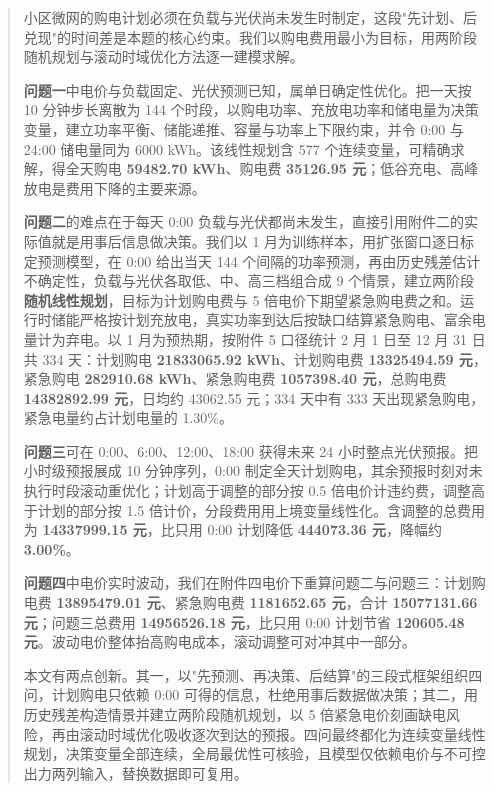 \begin{abstract}

小区微网的购电计划必须在负载与光伏尚未发生时制定，这段"先计划、后兑现"的时间差是本题的核心约束。我们以购电费用最小为目标，用两阶段随机规划与滚动时域优化方法逐一建模求解。

\textbf{问题一}中电价与负载固定、光伏预测已知，属单日确定性优化。把一天按 10 分钟步长离散为 144 个时段，以购电功率、充放电功率和储电量为决策变量，建立功率平衡、储能递推、容量与功率上下限约束，并令 0:00 与 24:00 储电量同为 6000 kWh。该线性规划含 577 个连续变量，可精确求解，得全天购电 \textbf{59482.70 kWh}、购电费 \textbf{35126.95 元}；低谷充电、高峰放电是费用下降的主要来源。

\textbf{问题二}的难点在于每天 0:00 负载与光伏都尚未发生，直接引用附件二的实际值就是用事后信息做决策。我们以 1 月为训练样本，用扩张窗口逐日标定预测模型，在 0:00 给出当天 144 个间隔的功率预测，再由历史残差估计不确定性，负载与光伏各取低、中、高三档组合成 9 个情景，建立两阶段\textbf{随机线性规划}，目标为计划购电费与 5 倍电价下期望紧急购电费之和。运行时储能严格按计划充放电，真实功率到达后按缺口结算紧急购电、富余电量计为弃电。以 1 月为预热期，按附件 5 口径统计 2 月 1 日至 12 月 31 日共 334 天：计划购电 \textbf{21833065.92 kWh}、计划购电费 \textbf{13325494.59 元}，紧急购电 \textbf{282910.68 kWh}、紧急购电费 \textbf{1057398.40 元}，总购电费 \textbf{14382892.99 元}，日均约 43062.55 元；334 天中有 333 天出现紧急购电，紧急电量约占计划电量的 1.30\%。

\textbf{问题三}可在 0:00、6:00、12:00、18:00 获得未来 24 小时整点光伏预报。把小时级预报展成 10 分钟序列，0:00 制定全天计划购电，其余预报时刻对未执行时段滚动重优化；计划高于调整的部分按 0.5 倍电价计违约费，调整高于计划的部分按 1.5 倍计价，分段费用用上境变量线性化。含调整的总费用为 \textbf{14337999.15 元}，比只用 0:00 计划降低 \textbf{444073.36 元}，降幅约 \textbf{3.00\%}。

\textbf{问题四}中电价实时波动，我们在附件四电价下重算问题二与问题三：计划购电费 \textbf{13895479.01 元}、紧急购电费 \textbf{1181652.65 元}，合计 \textbf{15077131.66 元}；问题三总费用 \textbf{14956526.18 元}，比只用 0:00 计划节省 \textbf{120605.48 元}。波动电价整体抬高购电成本，滚动调整可对冲其中一部分。

本文有两点创新。其一，以"先预测、再决策、后结算"的三段式框架组织四问，计划购电只依赖 0:00 可得的信息，杜绝用事后数据做决策；其二，用历史残差构造情景并建立两阶段随机规划，以 5 倍紧急电价刻画缺电风险，再由滚动时域优化吸收逐次到达的预报。四问最终都化为连续变量线性规划，决策变量全部连续，全局最优性可核验，且模型仅依赖电价与不可控出力两列输入，替换数据即可复用。


\end{abstract}
